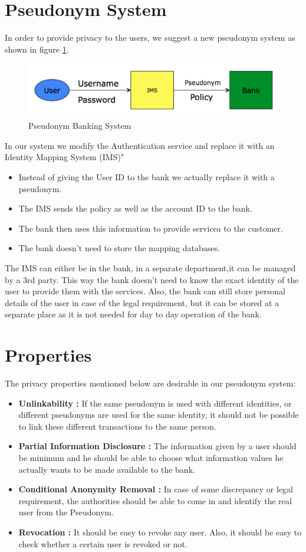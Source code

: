 \section{Pseudonym System}
In order to provide privacy to the users, we suggest a new pseudonym system as shown in figure \ref{fig:Pseudonym}.
\begin{figure}[h]
\centering
\includegraphics[width=\textwidth]{figures/Pseudonym}
\caption{Pseudonym Banking System}
\label{fig:Pseudonym}
\end{figure}
In our system we modify the Authentication service and replace it with an Identity Mapping System (IMS)"
\begin{itemize}
	\item Instead of giving the User ID to the bank we actually replace it with a pseudonym.
	\item The IMS sends the policy as well as the account ID to the bank.	
	\item The bank then uses this information to provide servicea to the customer.
	\item The bank doesn’t need to store the mapping databases.
\end{itemize}
The IMS can either be in the bank, in a separate department,it can be managed by a 3rd party. This way the bank doesn’t need to know the exact identity of the user to provide them with the services.
Also, the bank can still store personal details of the user in case of the legal requirement, but it can be stored at a separate place as it is not needed for day to day operation of the bank.
\section{Properties}
The privacy properties mentioned below are desirable in our pseudonym system:
\begin{itemize}
	\item \textbf{Unlinkability :} If the same pseudonym is used with different identities, or different pseudonyms are used for the same identity, it should not be possible to link these different transactions to the same person. 
	\item \textbf{Partial Information Disclosure :} The information given by a user should be minimum and he should be able to choose what information values he actually wants to be made available to the bank. 
	\item \textbf{Conditional Anonymity Removal :} In case of some discrepancy or legal requirement, the authorities should be able to come in and identify the real user from the Pseudonym.
	\item \textbf{Revocation :} It should be easy to revoke any user. Also, it should be easy to check whether a certain user is revoked or not. 
\end{itemize}

